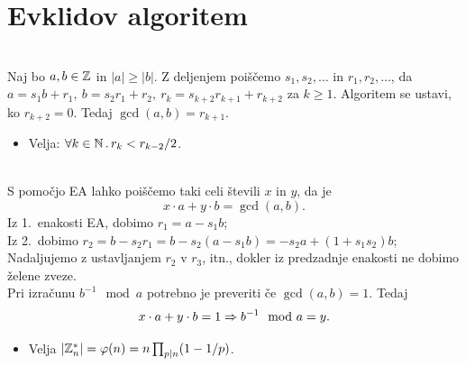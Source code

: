 \section{Evklidov algoritem}
\\
Naj bo \(a, b \in \mathbb{Z}\) in \(|a| \geq |b|\). Z deljenjem poiščemo \(s_1, s_2, \ldots\) in \(r_1, r_2, \ldots\), da \(a = s_1 b + r_1,\ b = s_2 r_1 + r_2,\ r_k = s_{k+2}r_{k+1} + r_{k+2}\) za \(k \geq 1\). Algoritem se ustavi, ko \(r_{k+2} = 0\). Tedaj \(\gcd(a, b) = r_{k+1}\).
\begin{itemize}
    \item Velja: \(\forall k \in \mathbb{N} \,.\, r_k < r_{k-2} / 2\).
\end{itemize}
\\
S pomočjo EA lahko poiščemo taki celi števili \(x\) in \(y\), da je 
\[
    x \cdot a + y \cdot b = \gcd(a, b).
\]
Iz 1.\ enakosti EA, dobimo \(r_1 = a - s_1 b\);\\
Iz 2.\ dobimo \(r_2 = b - s_2 r_1 = b - s_2(a - s_1b) = -s_2 a + (1+s_1s_2)b\);
Nadaljujemo z ustavljanjem \(r_2\) v \(r_3\), itn., dokler iz predzadnje enakosti ne dobimo želene zveze. \\
Pri izračunu \(b^{-1} \mod a\) potrebno je preveriti če \(\gcd(a, b) = 1\). Tedaj
\[
    x \cdot a + y \cdot b = 1 \Rightarrow b^{-1} \mod a = y.
\]
\begin{itemize}
    \item Velja \(|\mathbb{Z}_n^*| = \varphi(n) = n \prod_{p | n} (1 - 1/p)\).
\end{itemize}
